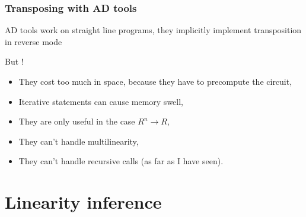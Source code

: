 \documentclass[10pt]{beamer}
\newcommand{\ra}{\rightarrow}
\begin{document}
\begin{frame}
  \frametitle{Transposing with AD tools}

  \begin{center}
    AD tools work on straight line programs, they implicitly implement
    transposition in reverse mode
  \end{center}

  \begin{block}{But !}
    \begin{itemize}
    \item They cost too much in space, because they have to precompute
      the circuit,
    \item Iterative statements can cause memory swell,
    \item They are only useful in the case $R^n\ra R$,
    \item They can't handle multilinearity,
    \item They can't handle recursive calls (as far as I have seen).
    \end{itemize}
  \end{block}
\end{frame}

\section{Linearity inference}
\end{document}
